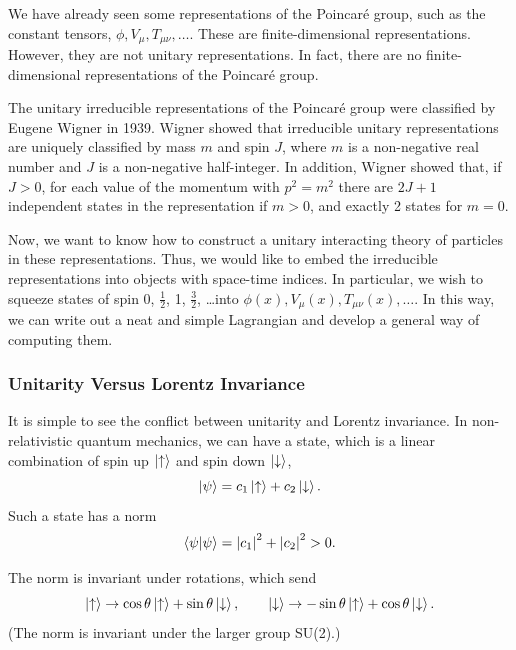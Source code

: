 \documentclass[11pt]{article}
\theoremstyle{definition}
\begin{document}
We have already seen some representations of the Poincaré group, such as the constant tensors, $\phi, V_\mu, T_{\mu\nu}, \ldots$. These are finite-dimensional representations. However, they are not unitary representations. In fact, there are no finite-dimensional representations of the Poincaré group.

The unitary irreducible representations of the Poincaré group were classified by Eugene Wigner in 1939. Wigner showed that irreducible unitary representations are uniquely classified by mass $m$ and spin $J$, where $m$ is a non-negative real number and $J$ is a non-negative half-integer. In addition, Wigner showed that, if $J>0$, for each value of the momentum with $p^2=m^2$ there are $2J+1$ independent states in the representation if $m>0$, and exactly 2 states for $m=0$.

Now, we want to know how to construct a unitary interacting theory of particles in these representations. Thus, we would like to embed the irreducible representations into objects with space-time indices. In particular, we wish to squeeze states of spin 0, ${\frac{1}{2}}$, 1, $\frac{3}{2}$, \ldots into $\phi(x), V_\mu(x), T_{\mu\nu}(x),\ldots$. In this way, we can write out a neat and simple Lagrangian and develop a general way of computing them.

\subsubsection{Unitarity Versus Lorentz Invariance}
It is simple to see the conflict between unitarity and Lorentz invariance. In non-relativistic quantum mechanics, we can have a state, which is a linear combination of spin up $\ket{\uparrow}$ and spin down $\ket{\downarrow}$,
\begin{equation}
    \ket{\psi} = c_1 \ket{\uparrow} + c_2 \ket{\downarrow}.
\end{equation}
Such a state has a norm
\begin{equation}
    \braket{\psi}{\psi} = \abs{c_1}^2 + \abs{c_2}^2 > 0.
\end{equation}

The norm is invariant under rotations, which send
\begin{equation}
    \ket{\uparrow} \rightarrow \cos\theta\ket{\uparrow} + \sin\theta\ket{\downarrow}, \qquad
    \ket{\downarrow} \rightarrow -\sin\theta\ket{\uparrow} + \cos\theta\ket{\downarrow}.
\end{equation}
(The norm is invariant under the larger group SU(2).)
\end{document}

